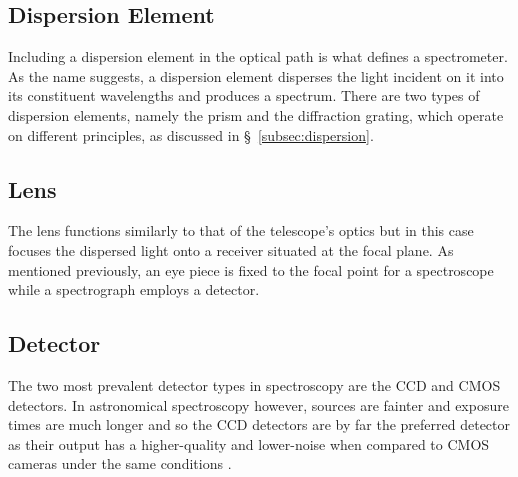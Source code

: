 


\subsection{Dispersion Element}

Including a dispersion element in the optical path is what defines a spectrometer. As the name suggests, a dispersion element disperses the light incident on it into its constituent wavelengths and produces a spectrum. There are two types of dispersion elements, namely the prism and the diffraction grating, which operate on different principles, as discussed in \S~\ref{subsec:dispersion}.

\subsection{Lens}

The lens functions similarly to that of the telescope's optics but in this case focuses the dispersed light onto a receiver situated at the focal plane. As mentioned previously, an eye piece is fixed to the focal point for a spectroscope while a spectrograph employs a detector.

\subsection{Detector}

The two most prevalent detector types in spectroscopy are the \gls{CCD} and \gls{CMOS} detectors. In astronomical spectroscopy however, sources are fainter and exposure times are much longer and so the \gls{CCD} detectors are by far the preferred detector as their output has a higher-quality and lower-noise when compared to \gls{CMOS} cameras under the same conditions \citep{CCDvsCMOS}.
\prgph

